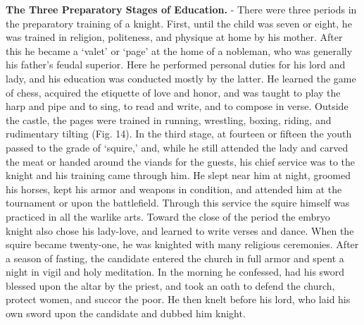 \documentclass[]{book}
\begin{document}
\textbf{The Three Preparatory Stages of Education.} - There were three periods in the preparatory training of a knight. First, until the child was seven or eight, he was trained in religion, politeness, and physique at home by his mother. After this he became a `valet' or `page' at the home of a nobleman, who was generally his father's feudal superior. Here he performed personal duties for his lord and lady, and his education was conducted mostly by the latter. He learned the game of chess, acquired the etiquette of love and honor, and was taught to play the harp and pipe and to sing, to read and write, and to compose in verse. Outside the castle, the pages were trained in running, wrestling, boxing, riding, and rudimentary tilting (Fig. 14). In the third stage, at fourteen or fifteen the youth passed to the grade of `squire,' and, while he still attended the lady and carved the meat or handed around the viands for the guests, his chief service was to the knight and his training came through him. He slept near him at night, groomed his horses, kept his armor and weapons in condition, and attended him at the tournament or upon the battlefield. Through this service the squire himself was practiced in all the warlike arts. Toward the close of the period the embryo knight also chose his lady-love, and learned to write verses and dance. When the squire became twenty-one, he was knighted with many religious ceremonies. After a season of fasting, the candidate entered the church in full armor and spent a night in vigil and holy meditation. In the morning he confessed, had his sword blessed upon the altar by the priest, and took an oath to defend the church, protect women, and succor the poor. He then knelt before his lord, who laid his own sword upon the candidate and dubbed him knight.
\end{document}
